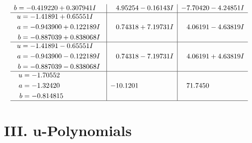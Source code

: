 \documentclass[1p]{elsarticle_modified}
\theoremstyle{definition}
\begin{document}
$$\begin{array}{c|c|c}
\begin{aligned}
b &= -0.419220 + 0.307941 I\end{aligned}
 & \phantom{-}4.95254 - 0.16143 I & -7.70420 - 4.24851 I \\ \hline\begin{aligned}
u &= -1.41891 + 0.65551 I \\
a &= -0.943900 + 0.122189 I \\
b &= -0.887039 + 0.838068 I\end{aligned}
 & \phantom{-}0.74318 + 7.19731 I & \phantom{-}4.06191 - 4.63819 I \\ \hline\begin{aligned}
u &= -1.41891 - 0.65551 I \\
a &= -0.943900 - 0.122189 I \\
b &= -0.887039 - 0.838068 I\end{aligned}
 & \phantom{-}0.74318 - 7.19731 I & \phantom{-}4.06191 + 4.63819 I \\ \hline\begin{aligned}
u &= -1.70552\phantom{ +0.000000I} \\
a &= -1.32420\phantom{ +0.000000I} \\
b &= -0.814815\phantom{ +0.000000I}\end{aligned}
 & -10.1201\phantom{ +0.000000I} & \phantom{-}71.7450\phantom{ +0.000000I}\\
 \hline 
 \end{array}$$\newpage
\newpage\renewcommand{\arraystretch}{1}
\centering \section*{ III. u-Polynomials}
\end{document}
